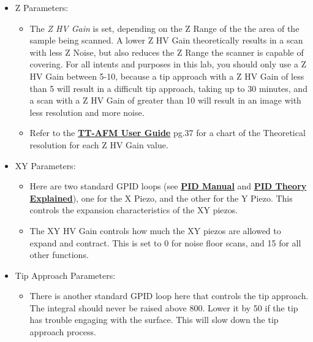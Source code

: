 \documentclass{../lab}
\begin{document}
\begin{itemize}
    \item Z Parameters:

    \begin{itemize}
        \item The \emph{Z HV Gain} is set, depending on the Z Range of the the area of the sample being scanned.  A lower Z HV Gain theoretically results in a scan with less Z Noise, but also reduces the Z Range the scanner is capable of covering.  For all intents and purposes in this lab, you should only use a Z HV Gain between 5-10, because a tip approach with a Z HV Gain of less than 5 will result in a difficult tip approach, taking up to 30 minutes, and a scan with a Z HV Gain of greater than 10 will result in an image with less resolution and more noise.

        \item Refer to the \href{http://experimentationlab.berkeley.edu/tt-afmuserguidev2.2}{\textbf{TT-AFM User Guide}} pg.37 for a chart of the Theoretical resolution for each Z HV Gain value.

    \end{itemize}

    \item XY Parameters:

    \begin{itemize}
        \item Here are two standard GPID loops (see  \href{http://experimentationlab.berkeley.edu/sites/default/files/PID_Manual.pdf}{\textbf{PID Manual}} and \href{http://experimentationlab.berkeley.edu/sites/default/files/PID_Theory_Explained.pdf}{\textbf{PID Theory Explained}}), one for the X Piezo, and the other for the Y Piezo.  This controls the expansion characteristics of the XY piezos.

        \item The XY HV Gain controls how much the XY piezos are allowed to expand and contract.  This is set to 0 for noise floor scans, and 15 for all other functions.

    \end{itemize}

    \item Tip Approach Parameters:
    \begin{itemize}
        \item There is another standard GPID loop here that controls the tip approach.  The integral should never be raised above 800. Lower it by 50 if the tip has trouble engaging with the surface.  This will slow down the tip approach process.


\end{itemize}
\end{itemize}
\end{document}
